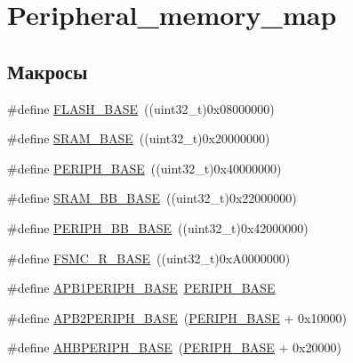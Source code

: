 \hypertarget{group___peripheral__memory__map}{}\section{Peripheral\+\_\+memory\+\_\+map}
\label{group___peripheral__memory__map}
\subsection*{Макросы}
\begin{DoxyCompactItemize}
\item 
\#define \mbox{\hyperlink{group___peripheral__memory__map_ga23a9099a5f8fc9c6e253c0eecb2be8db}{F\+L\+A\+S\+H\+\_\+\+B\+A\+SE}}~((uint32\+\_\+t)0x08000000)
\item 
\#define \mbox{\hyperlink{group___peripheral__memory__map_ga05e8f3d2e5868754a7cd88614955aecc}{S\+R\+A\+M\+\_\+\+B\+A\+SE}}~((uint32\+\_\+t)0x20000000)
\item 
\#define \mbox{\hyperlink{group___peripheral__memory__map_ga9171f49478fa86d932f89e78e73b88b0}{P\+E\+R\+I\+P\+H\+\_\+\+B\+A\+SE}}~((uint32\+\_\+t)0x40000000)
\item 
\#define \mbox{\hyperlink{group___peripheral__memory__map_gad3548b6e2f017f39d399358f3ac98454}{S\+R\+A\+M\+\_\+\+B\+B\+\_\+\+B\+A\+SE}}~((uint32\+\_\+t)0x22000000)
\item 
\#define \mbox{\hyperlink{group___peripheral__memory__map_gaed7efc100877000845c236ccdc9e144a}{P\+E\+R\+I\+P\+H\+\_\+\+B\+B\+\_\+\+B\+A\+SE}}~((uint32\+\_\+t)0x42000000)
\item 
\#define \mbox{\hyperlink{group___peripheral__memory__map_gaddf0e199dccba83272b20c9fb4d3aaed}{F\+S\+M\+C\+\_\+\+R\+\_\+\+B\+A\+SE}}~((uint32\+\_\+t)0x\+A0000000)
\item 
\#define \mbox{\hyperlink{group___peripheral__memory__map_ga45666d911f39addd4c8c0a0ac3388cfb}{A\+P\+B1\+P\+E\+R\+I\+P\+H\+\_\+\+B\+A\+SE}}~\mbox{\hyperlink{group___peripheral__memory__map_ga9171f49478fa86d932f89e78e73b88b0}{P\+E\+R\+I\+P\+H\+\_\+\+B\+A\+SE}}
\item 
\#define \mbox{\hyperlink{group___peripheral__memory__map_ga25b99d6065f1c8f751e78f43ade652cb}{A\+P\+B2\+P\+E\+R\+I\+P\+H\+\_\+\+B\+A\+SE}}~(\mbox{\hyperlink{group___peripheral__memory__map_ga9171f49478fa86d932f89e78e73b88b0}{P\+E\+R\+I\+P\+H\+\_\+\+B\+A\+SE}} + 0x10000)
\item 
\#define \mbox{\hyperlink{group___peripheral__memory__map_ga92eb5d49730765d2abd0f5b09548f9f5}{A\+H\+B\+P\+E\+R\+I\+P\+H\+\_\+\+B\+A\+SE}}~(\mbox{\hyperlink{group___peripheral__memory__map_ga9171f49478fa86d932f89e78e73b88b0}{P\+E\+R\+I\+P\+H\+\_\+\+B\+A\+SE}} + 0x20000)

\end{DoxyCompactItemize}
